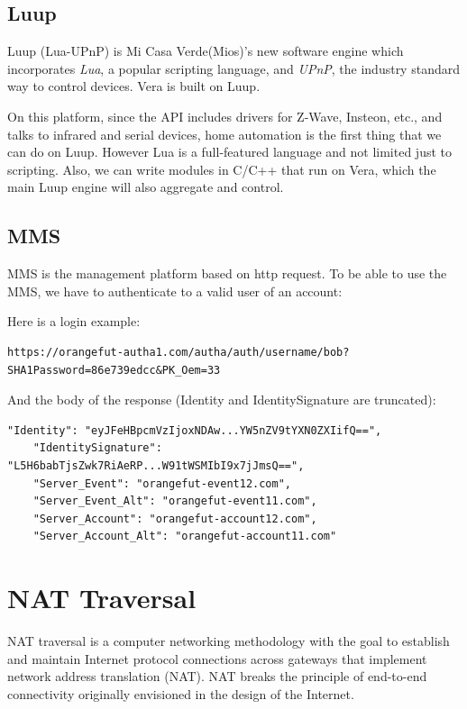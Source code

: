 \subsection{Luup}
Luup (Lua-UPnP) is Mi Casa Verde(Mios)’s new software engine which incorporates \textit{Lua}, a popular scripting language, and \textit{UPnP}, the industry standard way to control devices. Vera is built on Luup.

On this platform, since the API includes drivers for Z-Wave, Insteon, etc., and talks to infrared and serial devices, home automation is the first thing that we can do on Luup. However Lua is a full-featured language and not limited just to scripting. Also, we can write modules in C/C++ that run on Vera, which the main Luup engine will also aggregate and control.

\subsection{MMS}
MMS is the management platform based on http request. To be able to use the MMS, we have to authenticate to a valid user of an account:

Here is a login example:
\begin{lstlisting}[mathescape]
	https://orangefut-autha1.com/autha/auth/username/bob?SHA1Password=86e739edcc&PK_Oem=33
\end{lstlisting}

And the body of the response (Identity and IdentitySignature are truncated):

\begin{lstlisting}[mathescape]
    "Identity": "eyJFeHBpcmVzIjoxNDAw...YW5nZV9tYXN0ZXIifQ==",
    "IdentitySignature": "L5H6babTjsZwk7RiAeRP...W91tWSMIbI9x7jJmsQ==",
    "Server_Event": "orangefut-event12.com",
    "Server_Event_Alt": "orangefut-event11.com",
    "Server_Account": "orangefut-account12.com",
    "Server_Account_Alt": "orangefut-account11.com"
\end{lstlisting}
\section{NAT Traversal}
NAT traversal is a computer networking methodology with the goal to establish and maintain Internet protocol connections across gateways that implement network address translation (NAT). NAT breaks the principle of end-to-end connectivity originally envisioned in the design of the Internet.


